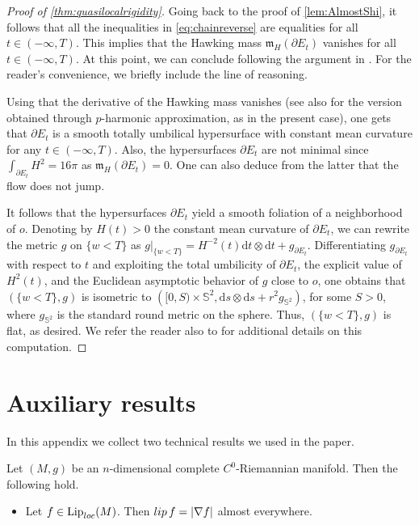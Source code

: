 \documentclass[a4paper,12pt,reqno]{amsart}
\numberwithin{equation}{section}
\theoremstyle{plain}
\theoremstyle{definition}
\theoremstyle{remark}
\newcommand{\lip}{{\rm lip \,}}
\DeclareMathOperator{\Lip}{Lip}
\begin{document}
{\begin{proof}[Proof of \cref{thm:quasilocalrigidity}]
Going back to the proof of \cref{lem:AlmostShi}, it follows that all the inequalities in \eqref{eq:chainreverse} are equalities for all $t \in (-\infty, T)$. This implies that the Hawking mass $\mathfrak{m}_H(\partial E_t) $ vanishes for all $t \in (-\infty, T)$. At this point, we can conclude following the argument in \cite[pp. 422-424]{HuiskenIlmanen}. For the reader's convenience, we briefly include the line of reasoning.

Using that the derivative of the Hawking mass \cite[Geroch Monotonicity Formula 5.8]{HuiskenIlmanen} vanishes (see also \cite[Theorem 5.5]{BenattiPludaPozzetta} for the version obtained through $p$-harmonic approximation, as in the present case), one gets that $\partial E_t$ is a smooth totally umbilical hypersurface with constant mean curvature for any $t \in (-\infty,T)$. Also, the hypersurfaces $\partial E_t$ are not minimal since $\int_{\partial E_t} H^2 = 16\pi$ as $\mathfrak{m}_H(\partial E_t)=0$. One can also deduce from the latter that the flow does not jump.

It follows that the hypersurfaces $\partial E_t$ yield a smooth foliation of a neighborhood of $o$. Denoting by $H(t)>0$ the constant mean curvature of $\partial E_t$, we can rewrite the metric $g$ on $\{w < T\}$ as $g|_{\{w < T\}} = H^{-2}(t)\mathrm{d} t \otimes \mathrm{d}t + g_{\partial E_t}$. Differentiating $g_{\partial E_t}$ with respect to $t$ and exploiting the total umbilicity of $\partial E_t$, the explicit value of $H^2(t)$, and the Euclidean asymptotic behavior of $g$ close to $o$, one obtains that $(\{w < T\},  g)$ is isometric to $\left( [0, S) \times \mathbb{S}^2, \mathrm{d}s \otimes \mathrm{d}s + r^2 g_{\mathbb{S}^2} \right)$, for some $S>0$, where $g_{\mathbb{S}^2}$ is the standard round metric on the sphere. Thus, $(\{w<T\},g)$ is flat, as desired. We refer the reader also to \cite[Proof of Theorem 1.2]{benatti2022minkowski} for additional details on this computation.
\end{proof}


\appendix

\section{Auxiliary results}

In this appendix we collect two technical results we used in the paper.

\begin{lemma}\label{lem:CoareaContinuousManifold}
Let $(M, g)$ be an $n$-dimensional complete $C^0$-Riemannian manifold. Then the following hold.
\begin{itemize}
    \item Let $f \in \Lip_{\rm loc}(M)$. Then $\lip f = |\nabla f|$ almost everywhere.


\end{itemize}
\end{lemma}}
\end{document}
